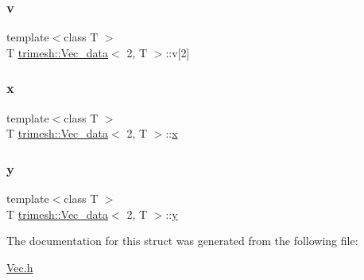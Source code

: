 \subsubsection{\texorpdfstring{v}{v}}
{\footnotesize\ttfamily template$<$class T $>$ \\
T \hyperlink{structtrimesh_1_1Vec__data}{trimesh\+::\+Vec\+\_\+data}$<$ 2, T $>$\+::v\mbox{[}2\mbox{]}}

\mbox{\label{structtrimesh_1_1Vec__data_3_012_00_01T_01_4_a516ae4d9b86b177b40f1f530d748fe3a}} 
\subsubsection{\texorpdfstring{x}{x}}
{\footnotesize\ttfamily template$<$class T $>$ \\
T \hyperlink{structtrimesh_1_1Vec__data}{trimesh\+::\+Vec\+\_\+data}$<$ 2, T $>$\+::\hyperlink{namespacetrimesh_a3365d1b1a1bc5d8e9c844cf589a8c4a8}{x}}

\mbox{\label{structtrimesh_1_1Vec__data_3_012_00_01T_01_4_a73ece1743d38b3798f51a30d7b86ae1b}} 
\subsubsection{\texorpdfstring{y}{y}}
{\footnotesize\ttfamily template$<$class T $>$ \\
T \hyperlink{structtrimesh_1_1Vec__data}{trimesh\+::\+Vec\+\_\+data}$<$ 2, T $>$\+::\hyperlink{namespacetrimesh_a56b35d0eb7039be92fcc4867080c7419}{y}}



The documentation for this struct was generated from the following file\+:\begin{DoxyCompactItemize}
\item 
\hyperlink{Vec_8h}{Vec.\+h}\end{DoxyCompactItemize}
